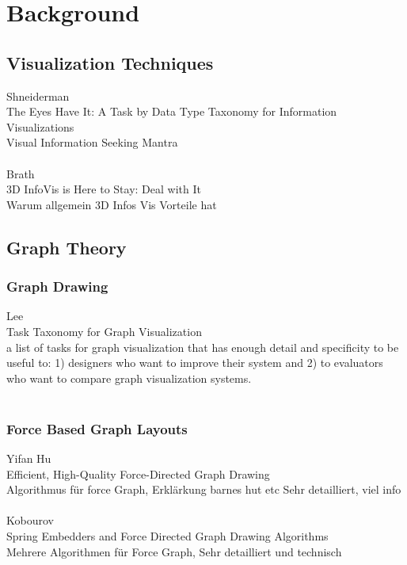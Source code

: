 \chapter{Background}

\section{Visualization Techniques}

Shneiderman\\
The Eyes Have It: A Task by Data Type Taxonomy for Information Visualizations\\
Visual Information Seeking Mantra\\
\\
Brath \\
3D InfoVis is Here to Stay: Deal with It\\
Warum allgemein 3D Infos Vis Vorteile hat\\

\section{Graph Theory}

\subsection{Graph Drawing}

Lee\\
Task Taxonomy for Graph Visualization\\
a list of tasks for graph visualization that has
enough detail and specificity to be useful to: 1) designers who
want to improve their system and 2) to evaluators who want to
compare graph visualization systems.\\
\\


\subsection{Force Based Graph Layouts}

Yifan Hu\\
Efficient, High-Quality Force-Directed Graph Drawing\\
Algorithmus für force Graph,  Erklärkung barnes hut etc Sehr detailliert, viel info\\
\\
Kobourov\\
Spring Embedders and Force Directed Graph Drawing Algorithms\\
Mehrere Algorithmen für Force Graph, Sehr detailliert und technisch \\
\\

